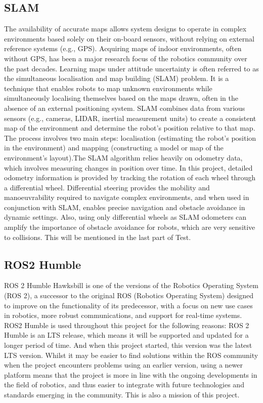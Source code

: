 \subsection{SLAM}
The availability of accurate maps allows system designs to operate in complex environments based solely on their on-board sensors, without relying on external reference systems (e.g., GPS). Acquiring maps of indoor environments, often without GPS, has been a major research focus of the robotics community over the past decades. Learning maps under attitude uncertainty is often referred to as the simultaneous localisation and map building (SLAM) problem. It is a technique that enables robots to map unknown environments while simultaneously localising themselves based on the maps drawn, often in the absence of an external positioning system.
SLAM combines data from various sensors (e.g., cameras, LIDAR, inertial measurement units) to create a consistent map of the environment and determine the robot's position relative to that map. The process involves two main steps: localisation (estimating the robot's position in the environment) and mapping (constructing a model or map of the environment's layout).The SLAM algorithm relies heavily on odometry data, which involves measuring changes in position over time. In this project, detailed odometry information is provided by tracking the rotation of each wheel through a differential wheel. Differential steering provides the mobility and manoeuvrability required to navigate complex environments, and when used in conjunction with SLAM, enables precise navigation and obstacle avoidance in dynamic settings. Also, using only differential wheels as SLAM odometers can amplify the importance of obstacle avoidance for robots, which are very sensitive to collisions. This will be mentioned in the last part of Test.
\subsection{ROS2 Humble}
ROS 2 Humble Hawksbill is one of the versions of the Robotics Operating System (ROS 2), a successor to the original ROS (Robotics Operating System) designed to improve on the functionality of its predecessor, with a focus on new use cases in robotics, more robust communications, and support for real-time systems.
ROS2 Humble is used throughout this project for the following reasons: ROS 2 Humble is an LTS release, which means it will be supported and updated for a longer period of time. And when this project started, this version was the latest LTS version. Whilst it may be easier to find solutions within the ROS community when the project encounters problems using an earlier version, using a newer platform means that the project is more in line with the ongoing developments in the field of robotics, and thus easier to integrate with future technologies and standards emerging in the community. This is also a mission of this project.
